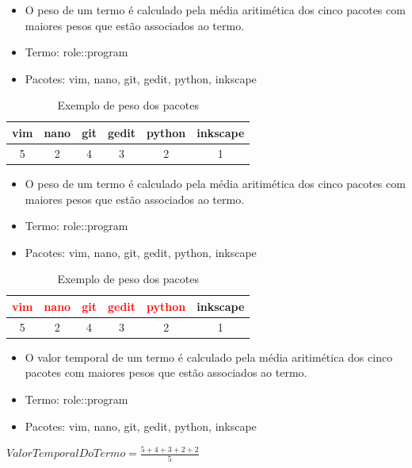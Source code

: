 \begin{frame}
    \begin{itemize}
        \item O peso de um termo é calculado pela média aritimética dos cinco
pacotes com maiores pesos que estão associados
ao termo.
        \item Termo: role::program
        \item Pacotes: vim, nano, git, gedit, python, inkscape
    \end{itemize}
    \begin{table}[h]
    \centering
    \begin{tabular}{cccccc}
    \hline
    \rowcolor[HTML]{EFEFEF}
    {vim} & {nano} & {git} & {gedit} & {python} & {inkscape} \\ \hline
    {5} & {2} & {4} & {3} & {2} & {1} \\ \hline
    \end{tabular}
    \caption{Exemplo de peso dos pacotes}
    \label{tab:classificacao_pacotes}
    \end{table}
\end{frame}

\begin{frame}
    \begin{itemize}
        \item O peso de um termo é calculado pela média aritimética dos cinco
pacotes com maiores pesos que estão associados
ao termo.
        \item Termo: role::program
        \item Pacotes: vim, nano, git, gedit, python, inkscape
    \end{itemize}
    \begin{table}[h]
    \centering
    \begin{tabular}{cccccc}
    \hline
    \rowcolor[HTML]{EFEFEF}
    {\textcolor{red}{vim}} & {\textcolor{red}{nano}} & {\textcolor{red}{git}} & {\textcolor{red}{gedit}} & {\textcolor{red}{python}} & {inkscape} \\ \hline
    {5} & {2} & {4} & {3} & {2} & {1} \\ \hline
    \end{tabular}
    \caption{Exemplo de peso dos pacotes}
    \label{tab:classificacao_pacotes}
    \end{table}
\end{frame}

\begin{frame}
    \begin{itemize}
        \item O valor temporal de um termo é calculado pela média aritimética dos cinco
pacotes com maiores pesos que estão associados
ao termo.
        \item Termo: role::program
        \item Pacotes: vim, nano, git, gedit, python, inkscape
    \end{itemize}

    $ValorTemporalDoTermo = \frac{5 + 4 + 3 + 2 + 2}{5}$
\end{frame}

